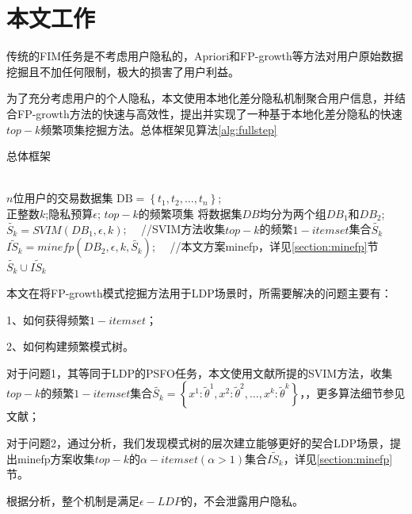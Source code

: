 \documentclass[UTF8]{ctexart}
\begin{document}
\section{本文工作}
\label{section:fullstep}
传统的FIM任务是不考虑用户隐私的，Apriori\cite{agrawal1994fast}和FP-growth\cite{han2000mining}等方法对用户原始数据挖掘且不加任何限制，极大的损害了用户利益。

为了充分考虑用户的个人隐私，本文使用本地化差分隐私机制聚合用户信息，并结合FP-growth方法\cite{han2000mining}的快速与高效性，提出并实现了一种基于本地化差分隐私的快速$top-k$频繁项集挖掘方法。总体框架见算法\ref{alg:fullstep}

\begin{algorithm}[htbp]
    \caption{总体框架}
    \label{alg:fullstep}
        \begin{algorithmic}[1]
        \REQUIRE ~~\\
        $n$位用户的交易数据集 $\mathrm{DB}=\left\{t_{1}, t_{2}, \ldots, t_{n}\right\}$;\\
        正整数$k$;隐私预算$\epsilon$;
        \ENSURE $top-k$的频繁项集
        \STATE 将数据集$DB$均分为两个组$D B_{1}$和$D B_{2}$;
        \label{fullstep:group}
			 \STATE $\tilde{S_k} = SVIM(DB_1,\epsilon,k)$; \ \  //SVIM\cite{wang2018locally}方法收集$top-k$的频繁$1-itemset$集合$\tilde{S_k}$
        \label{fullstep:SVIM}
			 \STATE $\tilde{IS_k} = minefp(DB_2,\epsilon,k,\tilde{S_k})$; \ \  //本文方案minefp，详见\ref{section:minefp}节
			 \label{fullstep:minefp}
        \RETURN $\tilde{S_k} \cup \tilde{IS_k}$
        \end{algorithmic}
\end{algorithm}

本文在将FP-growth模式挖掘方法用于LDP场景时，所需要解决的问题主要有：

1、如何获得频繁$1-itemset$；

2、如何构建频繁模式树。

对于问题1，其等同于LDP的PSFO任务，本文使用文献\cite{wang2018locally}所提的SVIM方法，收集$top-k$的频繁$1-itemset$集合$\tilde{S_k}=\left\{x^{1}: \tilde{\theta}^{1}, x^{2}: \tilde{\theta}^{2}, \ldots, x^{k}: \tilde{\theta}^{k}\right\}$，，更多算法细节参见文献；

对于问题2，通过分析，我们发现模式树的层次建立能够更好的契合LDP场景，提出minefp方案收集$top-k$的$\alpha -itemset(\alpha>1)$集合$\tilde{IS_k}$，详见\ref{section:minefp}节。

根据分析，整个机制是满足$\epsilon-LDP$的，不会泄露用户隐私。
\end{document}
